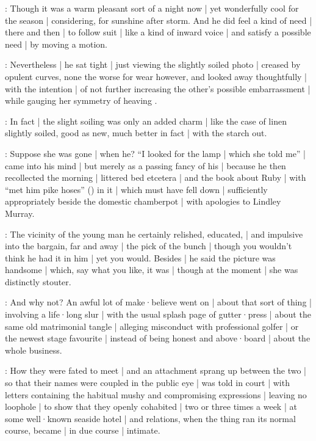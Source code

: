 :
Though it was a warm pleasant sort of a night now |
yet wonderfully cool for the season |
considering,
for sunshine after storm.
And he did feel a kind of need |
there and then |
to follow suit |
like a kind of inward voice |
and satisfy a possible need |
by moving a motion.

:
Nevertheless |
he sat tight |
just viewing the slightly soiled photo |
creased by opulent curves,
none the worse for wear however,
and looked away thoughtfully |
with the intention |
of not further increasing the other's possible embarrassment |
while gauging her symmetry of heaving .

:
In fact |
the slight soiling was only an added charm |
like the case of linen slightly soiled,
good as new,
much better in fact |
with the starch out.%

:
Suppose she was gone |
when he?
“I looked for the lamp |
which she told me” |
came into his mind |
but merely as a passing fancy of his |
because he then recollected the morning |
littered bed etcetera |
and the book about Ruby |
with “met him pike hoses”
()
in it |
which must have fell down |
sufficiently appropriately beside the domestic chamberpot |
with apologies to Lindley Murray.

:
The vicinity of the young man
he certainly relished,
educated,
 |
and impulsive into the bargain,
far and away |
the pick of the bunch |
though you wouldn't think he had it in him |
yet you would.
Besides |
he said the picture was handsome |
which,
say what you like,
it was |
though at the moment |
she was distinctly stouter.%

:
And why not?
An awful lot of make·believe went on |
about that sort of thing |
involving a life·long slur |
with the usual splash page of gutter·press |
about the same old matrimonial tangle |
alleging misconduct with professional golfer |
or the newest stage favourite |
instead of being honest and above·board |
about the whole business.

:
How they were fated to meet |
and an attachment sprang up between the two |
so that their names were coupled in the public eye |
was told in court |
with letters containing the habitual mushy and compromising expressions |
leaving no loophole |
to show that they openly cohabited |
two or three times a week |
at some well·known seaside hotel |
and relations,
when the thing ran its normal course,
became |
in due course |
intimate.%

